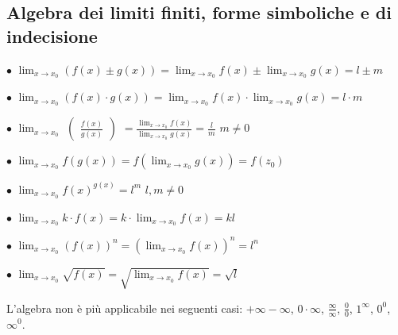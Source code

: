 \documentclass[a4paper,11pt]{article}
\begin{document}
\subsection{Algebra dei limiti finiti, forme simboliche e di indecisione}
\begin{minipage}{15cm}
    $\bullet$
    $\lim_{x \to x_0} (f(x) \pm g(x))=\lim_{x \to x_0} f(x) \pm \lim_{x \to x_0} g(x) = l \pm m $
    
    \vspace{1mm}
    
    $\bullet$
    $\lim_{x \to x_0} (f(x) \cdot g(x))= \lim_{x \to x_0} f(x) \cdot \lim_{x \to x_0 }g(x) = l \cdot m$
    
    \vspace{1mm}
    
    $\bullet$
    $\lim_{x \to x_0}$
    $\begin{pmatrix}
    \frac{f(x)}{g(x)}
    \end{pmatrix}$
    $= \frac{\lim_{x \to x_0} f(x)}{\lim_{x \to x_0} g(x)} = \frac{l}{m}$
    \hspace{1mm}
    $m \neq 0$
    
    \vspace{1mm}
    
    $\bullet$
    $\lim_{x \to x_0} f(g(x))= f(\lim_{x \to x_0 } g(x))=f(z_0) $
    
    $\bullet$
    $\lim_{x \to x_0} f(x)^{g(x)} = l^m  $
    \vspace{1mm}
    $l,m \neq 0$
    
    \vspace{1mm}
    $\bullet$
    $\lim_{x \to x_0} k \cdot f(x) = k \cdot \lim_{x \to x_0} f(x)= k l$
    
    \vspace{1mm}
    $\bullet$
    $\lim_{x \to x_0} (f(x))^n = (\lim_{x \to x_0} f(x))^n =l^n$
    
    \vspace{1mm}
    $\bullet$
    $\lim_{x \to x_0} \sqrt{f(x)} = \sqrt{\lim_{x \to x_0} f(x)} = \sqrt{l}$
    \end{minipage}
    
    \hspace{0.5mm}
    
    \begin{small}
    
    L'algebra non è più applicabile nei seguenti casi:
    $+ \infty - \infty$, $0 \cdot \infty$, $\frac{\infty}{\infty}$, $\frac{0}{0}$, $1^{\infty}$, $0^0$, $\infty ^0$.
    \end{small}
\end{document}
